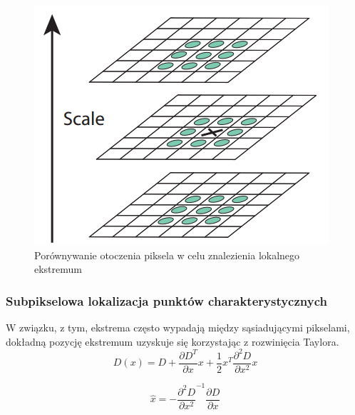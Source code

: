 \begin{figure}[!htb]
\centering
\includegraphics[scale=0.5]{pict/02/sift/sift_dgl_extremum.png}
\caption{Porównywanie otoczenia piksela w celu znalezienia lokalnego ekstremum}
\label{fig:sift_dgl_extremum}
\end{figure}
\subsubsection{Subpikselowa lokalizacja punktów charakterystycznych}
W związku, z tym, ekstrema często wypadają między sąsiadującymi pikselami, dokładną pozycję ekstremum uzyskuje się korzystając z rozwinięcia Taylora.
\begin{equation}
D(x) = D + \frac{\partial D^T}{\partial x}x + \frac{1}{2}x^T\frac{\partial^2D}{\partial x^2}x
\end{equation}

\begin{equation}
\widehat{x} = -\frac{\partial^2D}{\partial x^2}^{-1} \frac{\partial D}{\partial x}
\end{equation}



